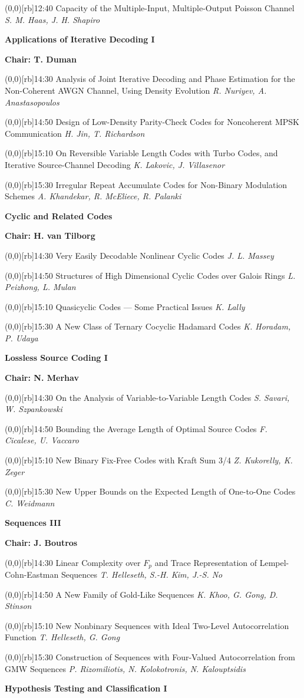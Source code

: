 \documentclass[a5paper,twoside]{article}
\def\period#1{\flushleft{\large\bfseries #1}\markboth{\sf #1}{\sf #1}}
\def\sesstitle#1{\vspace{.45\bigskipamount}\par{\bfseries #1}\par}
\def\sesschair#1{{\bfseries Chair: #1}\par\vspace{.65\medskipamount}}
\def\papertime#1{\makebox(0,0)[rb]{{\scriptsize #1}\hspace{.5em}}}
\def\papertitle#1{#1\hfil\break}
\def\paperauthors#1{{\itshape #1}\par\filbreak\vspace{.65\medskipamount}}
\begin{document}
\papertime{12:40}%
\papertitle{Capacity of the Multiple-Input, Multiple-Output Poisson Channel}
\paperauthors{S. M. Haas, J. H. Shapiro}
\period{Tue 14:30 -- 15:50}
\sesstitle{Applications of Iterative Decoding I}
\sesschair{T. Duman}
\papertime{14:30}%
\papertitle{Analysis of Joint Iterative Decoding and Phase Estimation for the Non-Coherent AWGN Channel, Using Density Evolution}
\paperauthors{R. Nuriyev, A. Anastasopoulos}
\papertime{14:50}%
\papertitle{Design of Low-Density Parity-Check Codes for Noncoherent MPSK Communication}
\paperauthors{H. Jin, T. Richardson}
\papertime{15:10}%
\papertitle{On Reversible Variable Length Codes with Turbo Codes, and Iterative Source-Channel Decoding}
\paperauthors{K. Lakovic, J. Villasenor}
\papertime{15:30}%
\papertitle{Irregular Repeat Accumulate Codes for Non-Binary Modulation Schemes}
\paperauthors{A. Khandekar, R. McEliece, R. Palanki}
\sesstitle{Cyclic and Related Codes}
\sesschair{H. van Tilborg}
\papertime{14:30}%
\papertitle{Very Easily Decodable Nonlinear Cyclic Codes}
\paperauthors{J. L. Massey}
\papertime{14:50}%
\papertitle{Structures of High Dimensional Cyclic Codes over Galois Rings}
\paperauthors{L. Peizhong, L. Mulan}
\papertime{15:10}%
\papertitle{Quasicyclic Codes --- Some Practical Issues}
\paperauthors{K. Lally}
\papertime{15:30}%
\papertitle{A New Class of Ternary Cocyclic Hadamard Codes}
\paperauthors{K. Horadam, P. Udaya}
\sesstitle{Lossless Source Coding I}
\sesschair{N. Merhav}
\papertime{14:30}%
\papertitle{On the Analysis of Variable-to-Variable Length Codes}
\paperauthors{S. Savari, W. Szpankowski}
\papertime{14:50}%
\papertitle{Bounding the Average Length of Optimal Source Codes}
\paperauthors{F. Cicalese, U. Vaccaro}
\papertime{15:10}%
\papertitle{New Binary Fix-Free Codes with Kraft Sum 3/4}
\paperauthors{Z. Kukorelly, K. Zeger}
\papertime{15:30}%
\papertitle{New Upper Bounds on the Expected Length of One-to-One Codes}
\paperauthors{C. Weidmann}
\sesstitle{Sequences III}
\sesschair{J. Boutros}
\papertime{14:30}%
\papertitle{Linear Complexity over $F_p$ and Trace Representation of Lempel-Cohn-Eastman Sequences}
\paperauthors{T. Helleseth, S.-H. Kim, J.-S. No}
\papertime{14:50}%
\papertitle{A New Family of Gold-Like Sequences}
\paperauthors{K. Khoo, G. Gong, D. Stinson}
\papertime{15:10}%
\papertitle{New Nonbinary Sequences with Ideal Two-Level Autocorrelation Function}
\paperauthors{T. Helleseth, G. Gong}
\papertime{15:30}%
\papertitle{Construction of Sequences with Four-Valued Autocorrelation from GMW Sequences}
\paperauthors{P. Rizomiliotis, N. Kolokotronis, N. Kalouptsidis}
\sesstitle{Hypothesis Testing and Classification I}
\end{document}
